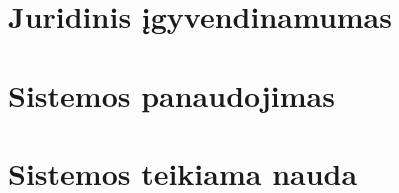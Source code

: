 \section{Juridinis įgyvendinamumas}


\section{Sistemos panaudojimas}


\section{Sistemos teikiama nauda}

